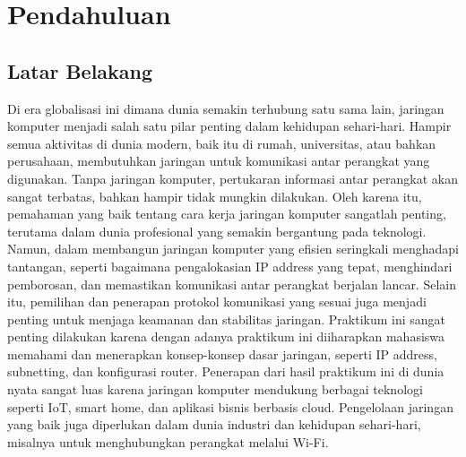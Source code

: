 \section{Pendahuluan}
\subsection{Latar Belakang}
Di era globalisasi ini dimana dunia semakin terhubung satu sama lain, jaringan komputer menjadi salah satu pilar penting dalam kehidupan sehari-hari. Hampir semua aktivitas di dunia modern, baik itu di rumah, universitas, atau bahkan perusahaan, membutuhkan jaringan untuk komunikasi antar perangkat yang digunakan. Tanpa jaringan komputer, pertukaran informasi antar perangkat akan sangat terbatas, bahkan hampir tidak mungkin dilakukan. Oleh karena itu, pemahaman yang baik tentang cara kerja jaringan komputer sangatlah penting, terutama dalam dunia profesional yang semakin bergantung pada teknologi.
Namun, dalam membangun jaringan komputer yang efisien seringkali menghadapi tantangan, seperti bagaimana pengalokasian IP address yang tepat, menghindari pemborosan, dan memastikan komunikasi antar perangkat berjalan lancar. Selain itu, pemilihan dan penerapan protokol komunikasi yang sesuai juga menjadi penting untuk menjaga keamanan dan stabilitas jaringan.
Praktikum ini sangat penting dilakukan karena dengan adanya praktikum ini diiharapkan mahasiswa memahami dan menerapkan konsep-konsep dasar jaringan, seperti IP address, subnetting, dan konfigurasi router.
Penerapan dari hasil praktikum ini di dunia nyata sangat luas karena jaringan komputer mendukung berbagai teknologi seperti IoT, smart home, dan aplikasi bisnis berbasis cloud. Pengelolaan jaringan yang baik juga diperlukan dalam dunia industri dan kehidupan sehari-hari, misalnya untuk menghubungkan perangkat melalui Wi-Fi.
